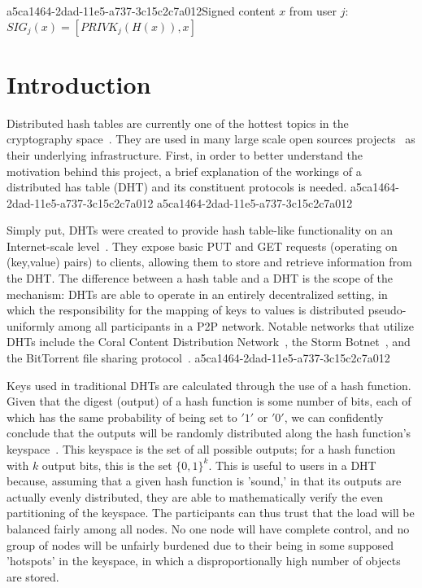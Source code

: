 \documentclass[12pt]{article}
\begin{document}
a5ca1464-2dad-11e5-a737-3c15c2c7a012Signed content $x$ from user $j$: $SIG_j(x) = \left[ PRIVK_j( H(x) ), x \right]$

\section{Introduction}
\par Distributed hash tables are currently one of the hottest topics in the cryptography space~\cite{Stoica:2001dj,Rowstron:2001ea,Ratnasamy:2001wn}. They are used in many large scale open sources projects~\cite{Freitas:2013tb,Xu:2010vs,Perfitt:2010fh} as their underlying infrastructure. First, in order to better understand the motivation behind this project, a brief explanation of the workings of a distributed has table (DHT) and its constituent protocols is needed.
a5ca1464-2dad-11e5-a737-3c15c2c7a012
a5ca1464-2dad-11e5-a737-3c15c2c7a012\par Simply put, DHTs were created to provide hash table-like functionality on an Internet-scale level~\cite{Ratnasamy:2001wn}. They expose basic PUT and GET requests (operating on (key,value) pairs) to clients, allowing them to store and retrieve information from the DHT. The difference between a hash table and a DHT is the scope of the mechanism: DHTs are able to operate in an entirely decentralized setting, in which the responsibility for the mapping of keys to values is distributed pseudo-uniformly among all participants in a P2P network. Notable networks that utilize DHTs include the Coral Content Distribution Network~\cite{Freedman:2004vb}, the Storm Botnet~\cite{Holz:2008uk}, and the BitTorrent file sharing protocol~\cite{Cohen:y1_8mBnw}.
a5ca1464-2dad-11e5-a737-3c15c2c7a012
\par Keys used in traditional DHTs are calculated through the use of a hash function. Given that the digest (output) of a hash function is some number of bits, each of which has the same probability of being set to $'1'$ or $'0'$, we can confidently conclude that the outputs will be randomly distributed along the hash function's keyspace~. This keyspace is the set of all possible outputs; for a hash function with $k$ output bits, this is the set $\{0,1\}^k$. This is useful to users in a DHT because, assuming that a given hash function is 'sound,' in that its outputs are actually evenly distributed, they are able to mathematically verify the even partitioning of the keyspace. The participants can thus trust that the load will be balanced fairly among all nodes. No one node will have complete control, and no group of nodes will be unfairly burdened due to their being in some supposed 'hotspots' in the keyspace, in which a disproportionally high number of objects are stored.~
\end{document}
